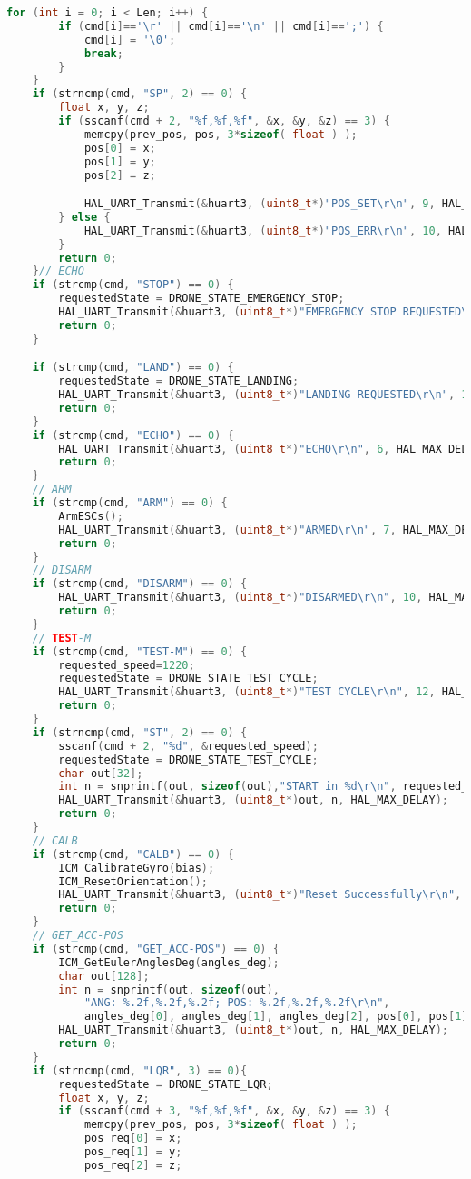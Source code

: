 \begin{lstlisting}[language=C++]
    for (int i = 0; i < Len; i++) {
        if (cmd[i]=='\r' || cmd[i]=='\n' || cmd[i]==';') {
            cmd[i] = '\0';
            break;
        }
    }
    if (strncmp(cmd, "SP", 2) == 0) {
        float x, y, z;
        if (sscanf(cmd + 2, "%f,%f,%f", &x, &y, &z) == 3) {
            memcpy(prev_pos, pos, 3*sizeof( float ) );
            pos[0] = x;
            pos[1] = y;
            pos[2] = z;

            HAL_UART_Transmit(&huart3, (uint8_t*)"POS_SET\r\n", 9, HAL_MAX_DELAY);
        } else {
            HAL_UART_Transmit(&huart3, (uint8_t*)"POS_ERR\r\n", 10, HAL_MAX_DELAY);
        }
        return 0;
    }// ECHO
    if (strcmp(cmd, "STOP") == 0) {
        requestedState = DRONE_STATE_EMERGENCY_STOP;
        HAL_UART_Transmit(&huart3, (uint8_t*)"EMERGENCY STOP REQUESTED\r\n", 26, HAL_MAX_DELAY);
        return 0;
    }

    if (strcmp(cmd, "LAND") == 0) {
        requestedState = DRONE_STATE_LANDING;
        HAL_UART_Transmit(&huart3, (uint8_t*)"LANDING REQUESTED\r\n", 19, HAL_MAX_DELAY);
        return 0;
    }
    if (strcmp(cmd, "ECHO") == 0) {
        HAL_UART_Transmit(&huart3, (uint8_t*)"ECHO\r\n", 6, HAL_MAX_DELAY);
        return 0;
    }
    // ARM
    if (strcmp(cmd, "ARM") == 0) {
        ArmESCs();
        HAL_UART_Transmit(&huart3, (uint8_t*)"ARMED\r\n", 7, HAL_MAX_DELAY);
        return 0;
    }
    // DISARM
    if (strcmp(cmd, "DISARM") == 0) {
        HAL_UART_Transmit(&huart3, (uint8_t*)"DISARMED\r\n", 10, HAL_MAX_DELAY);
        return 0;
    }
    // TEST-M
    if (strcmp(cmd, "TEST-M") == 0) {
        requested_speed=1220;
        requestedState = DRONE_STATE_TEST_CYCLE;
        HAL_UART_Transmit(&huart3, (uint8_t*)"TEST CYCLE\r\n", 12, HAL_MAX_DELAY);
        return 0;
    }
    if (strncmp(cmd, "ST", 2) == 0) {
        sscanf(cmd + 2, "%d", &requested_speed);
        requestedState = DRONE_STATE_TEST_CYCLE;
        char out[32];
        int n = snprintf(out, sizeof(out),"START in %d\r\n", requested_speed);
        HAL_UART_Transmit(&huart3, (uint8_t*)out, n, HAL_MAX_DELAY);
        return 0;
    }
    // CALB
    if (strcmp(cmd, "CALB") == 0) {
        ICM_CalibrateGyro(bias);
        ICM_ResetOrientation();
        HAL_UART_Transmit(&huart3, (uint8_t*)"Reset Successfully\r\n", 20, HAL_MAX_DELAY);
        return 0;
    }
    // GET_ACC-POS
    if (strcmp(cmd, "GET_ACC-POS") == 0) {
        ICM_GetEulerAnglesDeg(angles_deg);
        char out[128];
        int n = snprintf(out, sizeof(out),
            "ANG: %.2f,%.2f,%.2f; POS: %.2f,%.2f,%.2f\r\n",
            angles_deg[0], angles_deg[1], angles_deg[2], pos[0], pos[1], pos[2]);
        HAL_UART_Transmit(&huart3, (uint8_t*)out, n, HAL_MAX_DELAY);
        return 0;
    }
    if (strncmp(cmd, "LQR", 3) == 0){
        requestedState = DRONE_STATE_LQR;
        float x, y, z;
        if (sscanf(cmd + 3, "%f,%f,%f", &x, &y, &z) == 3) {
            memcpy(prev_pos, pos, 3*sizeof( float ) );
            pos_req[0] = x;
            pos_req[1] = y;
            pos_req[2] = z;


\end{lstlisting}
